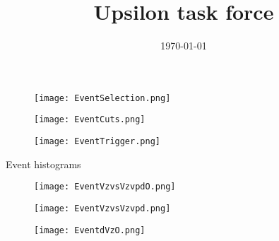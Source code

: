 \documentclass{beamer}
\title[Upsilon task force]{Upsilon task force}
\author{}
\date{\today}
\begin{document}

\begin{frame}
  \titlepage
\end{frame}




\begin{frame}
 	\begin{figure}[h!]
	\centering
	\texttt{[image: EventSelection.png]}
	\end{figure}
\end{frame}

\begin{frame}
 	\begin{figure}[h!]
	\centering
	\texttt{[image: EventCuts.png]}
	\end{figure}
\end{frame}

\begin{frame}
 	\begin{figure}[h!]
	\centering
	\texttt{[image: EventTrigger.png]}
	\end{figure}
\end{frame}

\begin{frame}[plain,c]
 	\begin{center}
 	\Huge Event histograms
 	\end{center}
	
\end{frame}

\begin{frame}
 	\begin{figure}[h!]
	\centering
	\texttt{[image: EventVzvsVzvpdO.png]}
	\end{figure}
\end{frame}

\begin{frame}
 	\begin{figure}[h!]
	\centering
	\texttt{[image: EventVzvsVzvpd.png]}
	\end{figure}
\end{frame}

\begin{frame}
 	\begin{figure}[h!]
	\centering
	\texttt{[image: EventdVzO.png]}
	\end{figure}
\end{frame}
\end{document}
